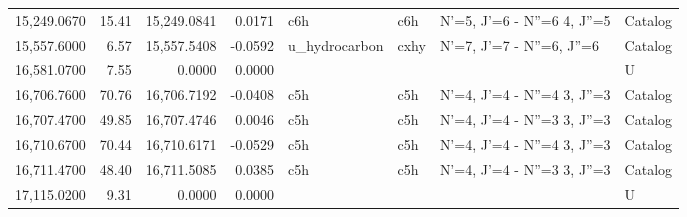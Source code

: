 \begin{longtable}{rrrrllll}
15,249.0670 &     15.41 &       15,249.0841 &    0.0171 &                         c6h &     c6h &      N'=5, J'=6 - N''=6     4, J''=5 &    Catalog \\
15,557.6000 &      6.57 &       15,557.5408 &   -0.0592 &               u_hydrocarbon &    cxhy &            N'=7, J'=7 - N''=6, J''=6 &    Catalog \\
16,581.0700 &      7.55 &            0.0000 &    0.0000 &                             &         &                                      &          U \\
16,706.7600 &     70.76 &       16,706.7192 &   -0.0408 &                         c5h &     c5h &      N'=4, J'=4 - N''=4     3, J''=3 &    Catalog \\
16,707.4700 &     49.85 &       16,707.4746 &    0.0046 &                         c5h &     c5h &      N'=4, J'=4 - N''=3     3, J''=3 &    Catalog \\
16,710.6700 &     70.44 &       16,710.6171 &   -0.0529 &                         c5h &     c5h &      N'=4, J'=4 - N''=4     3, J''=3 &    Catalog \\
16,711.4700 &     48.40 &       16,711.5085 &    0.0385 &                         c5h &     c5h &      N'=4, J'=4 - N''=3     3, J''=3 &    Catalog \\
17,115.0200 &      9.31 &            0.0000 &    0.0000 &                             &         &                                      &          U \\
\end{longtable}

